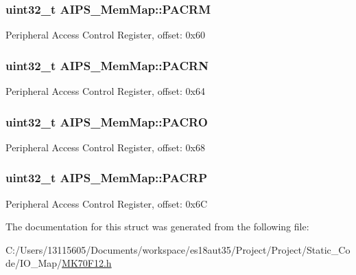 \subsubsection[{P\+A\+C\+R\+M}]{\setlength{\rightskip}{0pt plus 5cm}uint32\+\_\+t A\+I\+P\+S\+\_\+\+Mem\+Map\+::\+P\+A\+C\+R\+M}\label{struct_a_i_p_s___mem_map_a30e7ebe0ffb0e9d97cbfa85d65e17cbb}
Peripheral Access Control Register, offset\+: 0x60 \hypertarget{struct_a_i_p_s___mem_map_a83bf08b950901b8f6d7ef2ceb960baa8}{}
\subsubsection[{P\+A\+C\+R\+N}]{\setlength{\rightskip}{0pt plus 5cm}uint32\+\_\+t A\+I\+P\+S\+\_\+\+Mem\+Map\+::\+P\+A\+C\+R\+N}\label{struct_a_i_p_s___mem_map_a83bf08b950901b8f6d7ef2ceb960baa8}
Peripheral Access Control Register, offset\+: 0x64 \hypertarget{struct_a_i_p_s___mem_map_a5892f2b025c43f875f1c88e3a8f6da30}{}
\subsubsection[{P\+A\+C\+R\+O}]{\setlength{\rightskip}{0pt plus 5cm}uint32\+\_\+t A\+I\+P\+S\+\_\+\+Mem\+Map\+::\+P\+A\+C\+R\+O}\label{struct_a_i_p_s___mem_map_a5892f2b025c43f875f1c88e3a8f6da30}
Peripheral Access Control Register, offset\+: 0x68 \hypertarget{struct_a_i_p_s___mem_map_af6d96671be0c664042ec003595ac405e}{}
\subsubsection[{P\+A\+C\+R\+P}]{\setlength{\rightskip}{0pt plus 5cm}uint32\+\_\+t A\+I\+P\+S\+\_\+\+Mem\+Map\+::\+P\+A\+C\+R\+P}\label{struct_a_i_p_s___mem_map_af6d96671be0c664042ec003595ac405e}
Peripheral Access Control Register, offset\+: 0x6\+C 

The documentation for this struct was generated from the following file\+:\begin{DoxyCompactItemize}
\item 
C\+:/\+Users/13115605/\+Documents/workspace/es18aut35/\+Project/\+Project/\+Static\+\_\+\+Code/\+I\+O\+\_\+\+Map/\hyperlink{_m_k70_f12_8h}{M\+K70\+F12.\+h}\end{DoxyCompactItemize}
